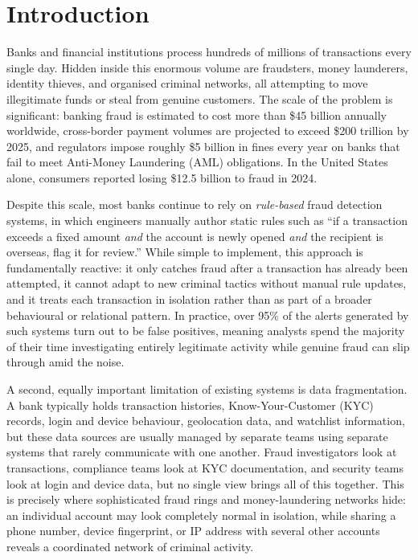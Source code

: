 \chapter{Introduction}

Banks and financial institutions process hundreds of millions of transactions every single day. Hidden inside this enormous volume are fraudsters, money launderers, identity thieves, and organised criminal networks, all attempting to move illegitimate funds or steal from genuine customers. The scale of the problem is significant: banking fraud is estimated to cost more than \$45 billion annually worldwide, cross-border payment volumes are projected to exceed \$200 trillion by 2025, and regulators impose roughly \$5 billion in fines every year on banks that fail to meet Anti-Money Laundering (AML) obligations. In the United States alone, consumers reported losing \$12.5 billion to fraud in 2024.

Despite this scale, most banks continue to rely on \textit{rule-based} fraud detection systems, in which engineers manually author static rules such as ``if a transaction exceeds a fixed amount \textit{and} the account is newly opened \textit{and} the recipient is overseas, flag it for review.'' While simple to implement, this approach is fundamentally reactive: it only catches fraud after a transaction has already been attempted, it cannot adapt to new criminal tactics without manual rule updates, and it treats each transaction in isolation rather than as part of a broader behavioural or relational pattern. In practice, over 95\% of the alerts generated by such systems turn out to be false positives, meaning analysts spend the majority of their time investigating entirely legitimate activity while genuine fraud can slip through amid the noise.

A second, equally important limitation of existing systems is data fragmentation. A bank typically holds transaction histories, Know-Your-Customer (KYC) records, login and device behaviour, geolocation data, and watchlist information, but these data sources are usually managed by separate teams using separate systems that rarely communicate with one another. Fraud investigators look at transactions, compliance teams look at KYC documentation, and security teams look at login and device data, but no single view brings all of this together. This is precisely where sophisticated fraud rings and money-laundering networks hide: an individual account may look completely normal in isolation, while sharing a phone number, device fingerprint, or IP address with several other accounts reveals a coordinated network of criminal activity.

